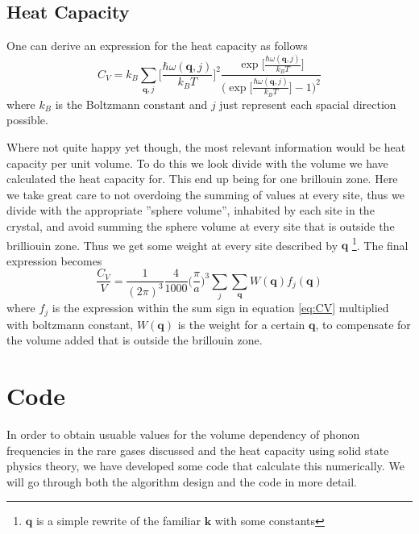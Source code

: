 \documentclass[11pt]{article}
\begin{document}
\subsection{Heat Capacity}
One can derive an expression for the heat capacity as follows\cite{bib:solid}
\begin{equation}
	C_V = k_B \sum_{\mathbf{q}, j} \Big[\frac{\hbar \omega(\mathbf{q},j)}{k_B T}\Big]^2
	\frac{\exp{\Big[\frac{\hbar \omega(\mathbf{q},j)}{k_B T}\Big]}}{\Big(\exp{\Big[\frac{\hbar \omega(\mathbf{q},j)}{k_B T}\Big]}-1\Big)^2}
	\label{eq:CV}
\end{equation}
where $k_B$ is the Boltzmann constant and $j$ just represent each spacial direction possible. 

Where not quite happy yet though, the most relevant information would be heat capacity per unit volume. To do this we look divide with the volume we have calculated the heat capacity for. This end up being for one brillouin zone. Here we take great care to not overdoing the summing of values at every site, thus we divide with the appropriate ''sphere volume'', inhabited by each site in the crystal, and avoid summing the sphere volume at every site that is outside the brilliouin zone. Thus we get some weight at every site described by $\mathbf{q}$ \footnote{$\mathbf{q}$ is a simple rewrite of the familiar $\mathbf{k}$ with some constants}. The final expression becomes
\begin{equation}
	\frac{C_V}{V} = \frac{1}{(2\pi)^3} \frac{4}{1000} \big(\frac{\pi}{a})^3 \sum_j \sum_{\mathbf{q}} W(\mathbf{q})f_j(\mathbf{q}) 
\end{equation}
where $f_j$ is the expression within the sum sign in equation \ref{eq:CV} multiplied with boltzmann constant, $W(\mathbf{q})$ is the weight for a certain $\mathbf{q}$, to compensate for the volume added that is outside the brillouin zone. 

\section{Code}
In order to obtain usuable values for the volume dependency of phonon frequencies in the rare gases discussed and the heat capacity using solid state physics theory, we have developed some code that calculate this numerically. We will go through both the algorithm design and the code in more detail. 
\end{document}
